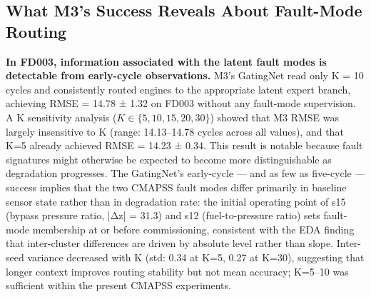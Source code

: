 \documentclass[review,12pt]{elsarticle}
\begin{document}
\subsection{What M3's Success Reveals About Fault-Mode Routing}

\textbf{In FD003, information associated with the latent fault modes is detectable from early-cycle observations.} M3's GatingNet read only K = 10 cycles and consistently routed engines to the appropriate latent expert branch, achieving RMSE = 14.78 ± 1.32 on FD003 without any fault-mode supervision. A K sensitivity analysis ($K \in \{5, 10, 15, 20, 30\}$) showed that M3 RMSE was largely insensitive to K (range: 14.13–14.78 cycles across all values), and that K=5 already achieved RMSE = 14.23 ± 0.34. This result is notable because fault signatures might otherwise be expected to become more distinguishable as degradation progresses. The GatingNet's early-cycle — and as few as five-cycle — success implies that the two CMAPSS fault modes differ primarily in baseline sensor state rather than in degradation rate: the initial operating point of s15 (bypass pressure ratio, |Δz| = 31.3) and s12 (fuel-to-pressure ratio) sets fault-mode membership at or before commissioning, consistent with the EDA finding that inter-cluster differences are driven by absolute level rather than slope. Inter-seed variance decreased with K (std: 0.34 at K=5, 0.27 at K=30), suggesting that longer context improves routing stability but not mean accuracy; K=5--10 was sufficient within the present CMAPSS experiments.
\end{document}

